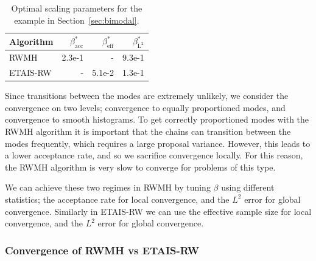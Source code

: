 \documentclass[final]{siamltex}
\begin{document}
\begin{table}[!htb]
      \centering
        \begin{tabular}{|l|r|r|r|}
	\hline
	Algorithm							& $\beta^*_{\text{acc}}$	& $\beta^*_{\text{eff}}$	& $\beta^*_{\text{L}^2}$ \\ \hline
	RWMH								& 2.3e-1					& - 						& 9.3e-1\\
	ETAIS-RW								& -						& 5.1e-2 					& 1.3e-1\\
	\hline
	\end{tabular}
	\vspace{2mm}
	\caption{Optimal scaling parameters for the example in Section~\ref{sec:bimodal}.}
	\label{tab:BM2_opt_delta}
\end{table}

Since transitions between the modes are extremely unlikely, we
consider the convergence on two levels; convergence to equally
proportioned modes, and convergence to smooth histograms.
To get correctly proportioned modes with the RWMH algorithm it is
important that the chains can transition between the modes frequently,
which requires a large proposal variance. However, this leads to a
lower acceptance rate, and so we sacrifice convergence locally. For
this reason, the RWMH algorithm is very slow to converge for problems
of this type.

We can achieve these two regimes in RWMH by tuning $\beta$ using
different statistics; the acceptance rate for local convergence, and
the $L^2$ error for global convergence. Similarly in ETAIS-RW we can
use the effective sample size for local convergence, and the $L^2$
error for global convergence.


\subsubsection{Convergence of RWMH vs ETAIS-RW}
\end{document}
